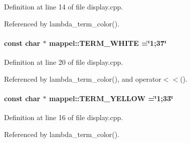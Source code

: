 Definition at line 14 of file display.\+cpp.



Referenced by lambda\+\_\+term\+\_\+color().

\paragraph[{\texorpdfstring{T\+E\+R\+M\+\_\+\+W\+H\+I\+TE}{TERM_WHITE}}]{\setlength{\rightskip}{0pt plus 5cm}const char $\ast$ mappel\+::\+T\+E\+R\+M\+\_\+\+W\+H\+I\+TE =\char`\"{}1;37\char`\"{}}\hypertarget{namespacemappel_aa0d4a391df8c98076fb8d02fe34ce24c}{}\label{namespacemappel_aa0d4a391df8c98076fb8d02fe34ce24c}


Definition at line 20 of file display.\+cpp.



Referenced by lambda\+\_\+term\+\_\+color(), and operator$<$$<$().

\paragraph[{\texorpdfstring{T\+E\+R\+M\+\_\+\+Y\+E\+L\+L\+OW}{TERM_YELLOW}}]{\setlength{\rightskip}{0pt plus 5cm}const char $\ast$ mappel\+::\+T\+E\+R\+M\+\_\+\+Y\+E\+L\+L\+OW =\char`\"{}1;33\char`\"{}}\hypertarget{namespacemappel_ae85ff1ec27541515a29ca8b7301866dd}{}\label{namespacemappel_ae85ff1ec27541515a29ca8b7301866dd}


Definition at line 16 of file display.\+cpp.



Referenced by lambda\+\_\+term\+\_\+color().

